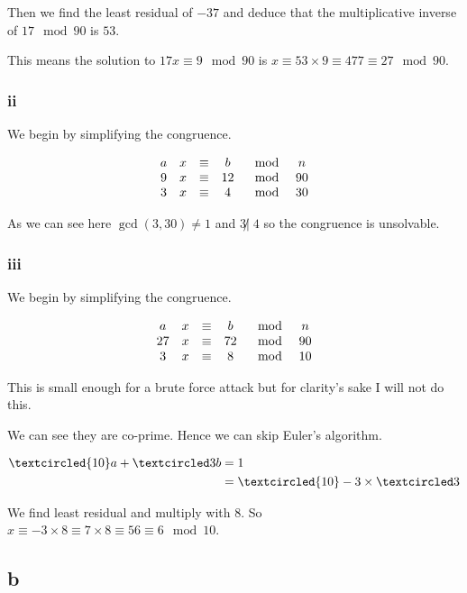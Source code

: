 \documentclass{article}
\begin{document}
Then we find the least residual of $-37$ and deduce that the multiplicative inverse of $17 \mod 90$ is $53$.

This means the solution to $17 x \equiv 9 \mod 90$ is $x \equiv 53 \times 9 \equiv 477 \equiv 27 \mod 90$.

\subsubsection{ii}

We begin by simplifying the congruence.

$$\begin{matrix}
		a & x & \equiv & b  & \mod & n  \\
		9 & x & \equiv & 12 & \mod & 90 \\
		3 & x & \equiv & 4  & \mod & 30
	\end{matrix}$$

As we can see here $\gcd (3,30) \ne 1$ and $3 \not|\;4$ so the congruence is unsolvable.

\subsubsection{iii}

We begin by simplifying the congruence.

$$\begin{matrix}
		a  & x & \equiv & b  & \mod & n  \\
		27 & x & \equiv & 72 & \mod & 90 \\
		3  & x & \equiv & 8  & \mod & 10 \\
	\end{matrix}$$

This is small enough for a brute force attack but for clarity's sake I will not do this.

We can see they are co-prime. Hence we can skip Euler's algorithm.

\begin{align*}
	\textcircled{10}a + \textcircled 3b & = 1                                           \\
	                                    & = \textcircled {10} - 3 \times \textcircled 3
\end{align*}

We find least residual and multiply with $8$. So $x \equiv -3 \times 8 \equiv 7 \times 8 \equiv 56 \equiv 6 \mod 10$.

\subsection{b}
\end{document}

